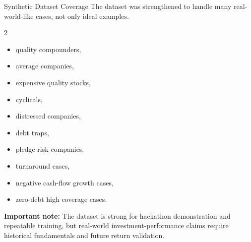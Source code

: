 \documentclass[aspectratio=169]{beamer}
\begin{document}
\begin{frame}{Synthetic Dataset Coverage}
\small
\justifying
The dataset was strengthened to handle many real-world-like cases, not only ideal examples.

\vspace{0.2cm}
\begin{multicols}{2}
\begin{itemize}
  \item quality compounders,
  \item average companies,
  \item expensive quality stocks,
  \item cyclicals,
  \item distressed companies,
  \item debt traps,
  \item pledge-risk companies,
  \item turnaround cases,
  \item negative cash-flow growth cases,
  \item zero-debt high coverage cases.
\end{itemize}
\end{multicols}

\vspace{0.2cm}
\textbf{Important note:} The dataset is strong for hackathon demonstration and repeatable training, but real-world investment-performance claims require historical fundamentals and future return validation.
\end{frame}
\end{document}
